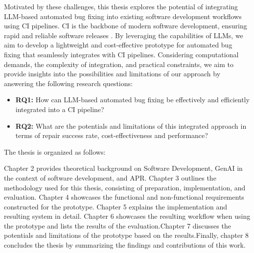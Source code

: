 Motivated by these challenges, this thesis explores the potential of integrating LLM-based automated bug fixing into existing software development workflows using \ac{CI} pipelines. \ac{CI} is the backbone of modern software development, ensuring rapid and reliable software releases \cite{ugwuezeContinuousIntegrationDeployment2024}. By leveraging the capabilities of \acp{LLM}, we aim to develop a lightweight and cost-effective prototype for automated bug fixing that seamlessly integrates with \ac{CI} pipelines. Considering computational demands, the complexity of integration, and practical constraints, we aim to provide insights into the possibilities and limitations of our approach by answering the following research questions:

\vspace{1em}

\begin{itemize}
    \item \textbf{RQ1:} How can LLM-based automated bug fixing be effectively and efficiently integrated into a CI pipeline?
    \item \textbf{RQ2:} What are the potentials and limitations of this integrated approach in terms of repair success rate, cost-effectiveness and performance?
\end{itemize}

The thesis is organized as follows:

Chapter 2 provides theoretical background on Software Development, \ac{GenAI} in the context of software development, and \ac{APR}. Chapter 3 outlines the methodology used for this thesis, consisting of preparation, implementation, and evaluation. Chapter 4 showcases the functional and non-functional requirements constructed for the prototype.
Chapter 5 explains the implementation and resulting system in detail. Chapter 6 showcases the resulting workflow when using the prototype and lists the results of the evaluation.Chapter 7 discusses the potentials and limitations of the prototype based on the results.Finally, chapter 8 concludes the thesis by summarizing the findings and contributions of this work.

